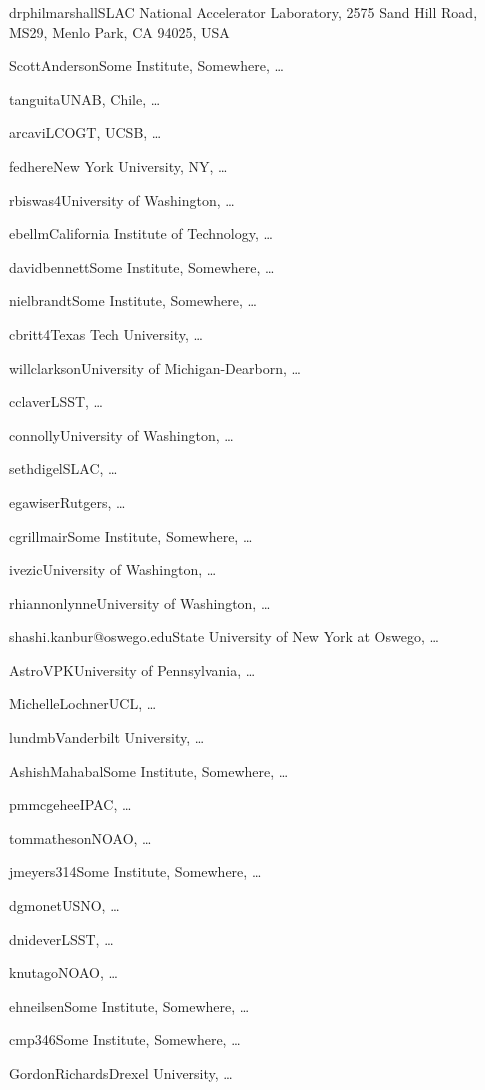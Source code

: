 
\vspace{4\baselineskip}


\vspace{\baselineskip}

\author{Phil Marshall}{drphilmarshall}{SLAC National Accelerator Laboratory, 2575 Sand Hill Road, MS29, Menlo Park, CA 94025, USA}
\author{Scott Anderson}{ScottAnderson}{Some Institute, Somewhere, \ldots}
\author{Timo Anguita}{tanguita}{UNAB, Chile, \ldots}
\author{Iair Arcavi}{arcavi}{LCOGT, UCSB, \ldots}
\author{Federica B. Bianco}{fedhere}{New York University, NY, \ldots}
\author{Rahul Biswas}{rbiswas4}{University of Washington, \ldots}
\author{Eric C.\ Bellm}{ebellm}{California Institute of Technology, \ldots}
\author{David Bennett}{davidbennett}{Some Institute, Somewhere, \ldots}
\author{Niel Brandt}{nielbrandt}{Some Institute, Somewhere, \ldots}
\author{Chris Britt}{cbritt4}{Texas Tech University, \ldots}
\author{Will Clarkson}{willclarkson}{University of Michigan-Dearborn, \ldots}
\author{Chuck Claver}{cclaver}{LSST, \ldots}
\author{Andy Connolly}{connolly}{University of Washington, \ldots}
\author{Seth Digel}{sethdigel}{SLAC, \ldots}
\author{Eric Gawiser}{egawiser}{Rutgers, \ldots}
\author{Carl Grillmair}{cgrillmair}{Some Institute, Somewhere, \ldots}
\author{\v{Z}eljko Ivezi\'{c}}{ivezic}{University of Washington, \ldots}
\author{Lynne Jones}{rhiannonlynne}{University of Washington, \ldots}
\author{Shashi Kanbur}{shashi.kanbur@oswego.edu}{State University of New York at Oswego, \dots}
\author{Vishal Kasliwal}{AstroVPK}{University of Pennsylvania, \ldots}
\author{Michelle Lochner}{MichelleLochner}{UCL, \ldots}
\author{Michael B.\ Lund}{lundmb}{Vanderbilt University, \ldots}
\author{Ashish Mahabal}{AshishMahabal}{Some Institute, Somewhere, \ldots}
\author{Peregrine McGehee}{pmmcgehee}{IPAC, \ldots}
\author{Tom Matheson}{tommatheson}{NOAO, \ldots}
\author{Josh Meyers}{jmeyers314}{Some Institute, Somewhere, \ldots}
\author{Dave Monet}{dgmonet}{USNO, \ldots}
\author{David Nidever}{dnidever}{LSST, \ldots}
\author{Knut Olsen}{knutago}{NOAO, \ldots}
\author{Eric Neilsen}{ehneilsen}{Some Institute, Somewhere, \ldots}
\author{Christina Peters}{cmp346}{Some Institute, Somewhere, \ldots}
\author{Gordon Richards}{GordonRichards}{Drexel University, \ldots}
